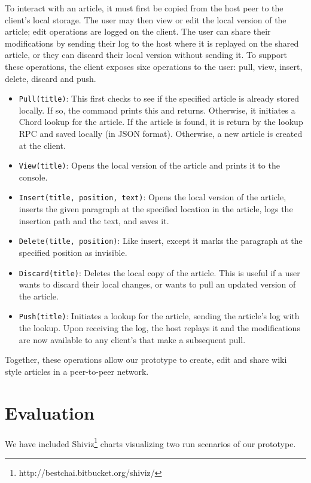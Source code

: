 \documentclass[twocolumn]{article}
\begin{document}
To interact with an article, it must first be copied from the host peer to the client's local storage. The user may then view or edit the local version of the article; edit operations are logged on the client. The user can share their modifications by sending their log to the host where it is replayed on the shared article, or they can discard their local version without sending it. To support these operations, the client exposes sixe operations to the user: pull, view, insert, delete, discard and push.
\begin{itemize}
  \item \texttt{Pull(title)}: This first checks to see if the specified article is already stored locally. If so, the command prints this and returns. Otherwise, it initiates a Chord lookup for the article. If the article is found, it is return by the lookup RPC and saved locally (in JSON format). Otherwise, a new article is created at the client.
  \item \texttt{View(title)}: Opens the local version of the article and prints it to the console.
  \item \texttt{Insert(title, position, text)}: Opens the local version of the article, inserts the given paragraph at the specified location in the article, logs the insertion path and the text, and saves it.
  \item \texttt{Delete(title, position)}: Like insert, except it marks the paragraph at the specified position as invisible.
  \item \texttt{Discard(title)}: Deletes the local copy of the article. This is useful if a user wants to discard their local changes, or wants to pull an updated version of the article.
  \item \texttt{Push(title)}: Initiates a lookup for the article, sending the article's log with the lookup. Upon receiving the log, the host replays it and the modifications are now available to any client's that make a subsequent pull.
\end{itemize}
Together, these operations allow our prototype to create, edit and share wiki style articles in a peer-to-peer network.

\section{Evaluation}
We have included Shiviz\footnote{http://bestchai.bitbucket.org/shiviz/} charts visualizing two run scenarios of our prototype.
\end{document}
